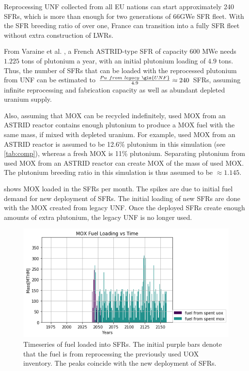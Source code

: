 Reprocessing \gls{UNF} collected from all EU nations can start approximately
240 \glspl{SFR}, which is more than enough for two generations of 66GWe \gls{SFR}
fleet. With the \gls{SFR} breeding ratio of over one, France can transition into
a fully \gls{SFR} fleet without extra construction of \glspl{LWR}. 

From Varaine et al. \cite{varaine_pre-conceptual_2012}, a French
ASTRID-type \gls{SFR} of capacity 600 MWe needs $1.225$ tons of
plutonium a year, with an initial plutonium loading of $4.9$ tons. 
Thus, the number of \glspl{SFR} that can be loaded with the reprocessed
plutonium from \gls{UNF} can be estimated to $\frac{Pu \ from \ legacy \ \gls{UNF}}{4.9} \approx 240$ \glspl{SFR},
assuming infinite reprocessing and fabrication capacity as well as
abundant depleted uranium supply. 

Also, assuming that \gls{MOX} can be recycled indefinitely,
used \gls{MOX} from an ASTRID reactor contains enough plutonium to produce a \gls{MOX} fuel with
the same mass, if mixed with depleted uranium. For example,
used \gls{MOX} from an ASTRID reactor is assumed to be 12.6\% plutonium
in this simulation (see \cref{tab:comp}), whereas a fresh \gls{MOX} is 11\% plutonium.
Separating plutonium from used \gls{MOX} from
an ASTRID reactor can create \gls{MOX} of the mass of used \gls{MOX}.
The plutonium breeding ratio in this simulation is thus assumed to be
$\approx 1.145$.

 shows \gls{MOX} loaded in the \glspl{SFR} per month.
The spikes are due to initial fuel demand for new deployment of \glspl{SFR}.
The initial loading of new \glspl{SFR} are done with the \gls{MOX} created
from legacy \gls{UNF}. Once the deployed \glspl{SFR} create enough amounts
 of extra plutonium, the legacy \gls{UNF} is no longer used. 

\begin{figure}[htbp!]
	\begin{center}
		\includegraphics[scale=0.7]{./images/french-transition/where_fuel.png}
	\end{center}
	\caption{Timeseries of fuel loaded into \glspl{SFR}.
			 The initial purple bars denote that the fuel is from reprocessing
			 the previously used \gls{UOX} inventory. The peaks coincide
			 with the new deployment of \glspl{SFR}.}
	\label{fig:fuel}
\end{figure}

